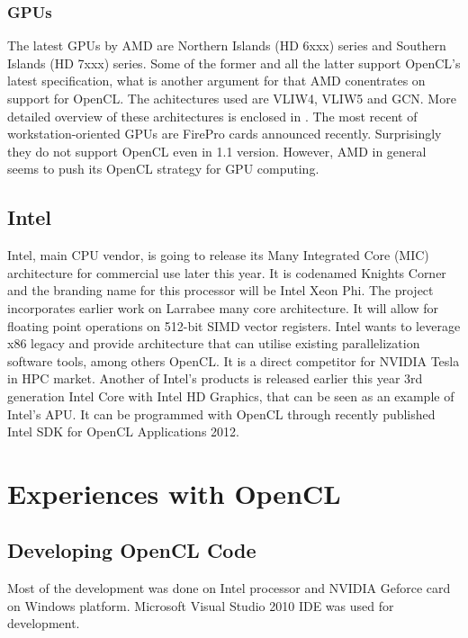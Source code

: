 \subsubsection{GPUs}
The latest GPUs by AMD are Northern Islands (HD 6xxx) series and Southern Islands (HD 7xxx) series. Some of the former and all the latter support OpenCL's latest specification, what is another argument for that AMD conentrates on support for OpenCL. The achitectures used are VLIW4, VLIW5 and GCN. More detailed overview of these architectures is enclosed in \cite{nielsen2012}. The most recent of workstation-oriented GPUs are FirePro cards announced recently. Surprisingly they do not support OpenCL even in 1.1 version. However, AMD in general seems to push its OpenCL strategy for GPU computing.


\subsection{Intel}
Intel, main CPU vendor, is going to release its Many Integrated Core (MIC) architecture for commercial use later this year. It is codenamed Knights Corner and the branding name for this processor will be Intel Xeon Phi. The project incorporates earlier work on Larrabee many core architecture. It will allow for floating point operations on 512-bit SIMD vector registers. Intel wants to leverage x86 legacy and provide architecture that can utilise existing parallelization software tools, among others OpenCL. It is a direct competitor for NVIDIA Tesla in HPC market. Another of Intel's products is released earlier this year 3rd generation Intel Core with Intel HD Graphics, that can be seen as an example of Intel's APU. It can be programmed with OpenCL through recently published Intel SDK for OpenCL Applications 2012.


\section{Experiences with OpenCL}
\subsection{Developing OpenCL Code}
Most of the development was done on Intel processor and NVIDIA Geforce card on Windows platform. Microsoft Visual Studio 2010 IDE was used for development.

